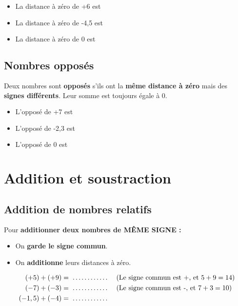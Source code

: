 \begin{examplebox}
\begin{itemize}[label = \textbullet]
\item La distance à zéro de +6 est \trous{2cm}
\item La distance à zéro de -4,5 est \trous{2cm}
\item La distance à zéro de 0 est \trous{2cm}
\end{itemize}
\end{examplebox}

\subsection{Nombres opposés}

\begin{definitionbox}
Deux nombres sont \textbf{opposés} s'ils ont la \textbf{même distance à zéro} mais des \textbf{signes différents}. Leur somme est toujours égale à 0.
\end{definitionbox}

\begin{examplebox}
\begin{itemize}[label = \textbullet]
\item L'opposé de +7 est \trous{2cm}
\item L'opposé de -2,3 est \trous{2cm}
\item L'opposé de 0 est \trous{2cm}
\end{itemize}
\end{examplebox}

\section{Addition et soustraction}
\subsection{Addition de nombres relatifs}
\begin{proprietebox}
Pour \textbf{additionner deux nombres de MÊME SIGNE :}
\begin{itemize}[label = \textbullet]
\item On \textbf{garde le signe commun}.
\item On \textbf{additionne} leurs distances à zéro.
\end{itemize}
\end{proprietebox}

\begin{examplebox}
\begin{align*}
(+5) + (+9) &= \trous{2cm} \quad \text{(Le signe commun est +, et } 5 + 9 = 14\text{)} \\
(-7) + (-3) &= \trous{2cm} \quad \text{(Le signe commun est -, et } 7 + 3 = 10\text{)} \\
(-1,5) + (-4) &= \trous{2cm}
\end{align*}
\end{examplebox}

